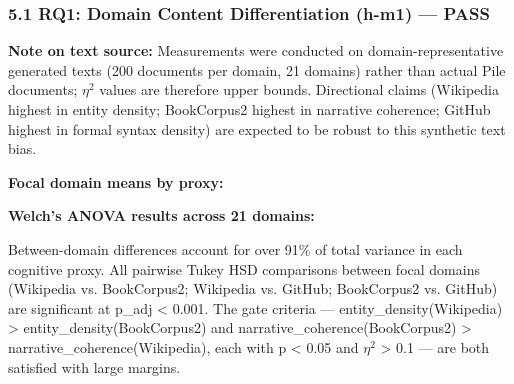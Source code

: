 
\subsubsection{5.1 RQ1: Domain Content Differentiation (h-m1) --- PASS}

\textbf{Note on text source:} Measurements were conducted on domain-representative generated texts (200 documents per domain, 21 domains) rather than actual Pile documents; $\eta^2$ values are therefore upper bounds. Directional claims (Wikipedia highest in entity density; BookCorpus2 highest in narrative coherence; GitHub highest in formal syntax density) are expected to be robust to this synthetic text bias.

\textbf{Focal domain means by proxy:}

\begin{table}[htbp]
\centering
{}
\end{table}

\textbf{Welch's ANOVA results across 21 domains:}

\begin{table}[htbp]
\centering
{}
\end{table}

Between-domain differences account for over 91\% of total variance in each cognitive proxy. All pairwise Tukey HSD comparisons between focal domains (Wikipedia vs. BookCorpus2; Wikipedia vs. GitHub; BookCorpus2 vs. GitHub) are significant at p\_adj < 0.001. The gate criteria --- entity\_density(Wikipedia) > entity\_density(BookCorpus2) and narrative\_coherence(BookCorpus2) > narrative\_coherence(Wikipedia), each with p < 0.05 and $\eta^2$ > 0.1 --- are both satisfied with large margins.


